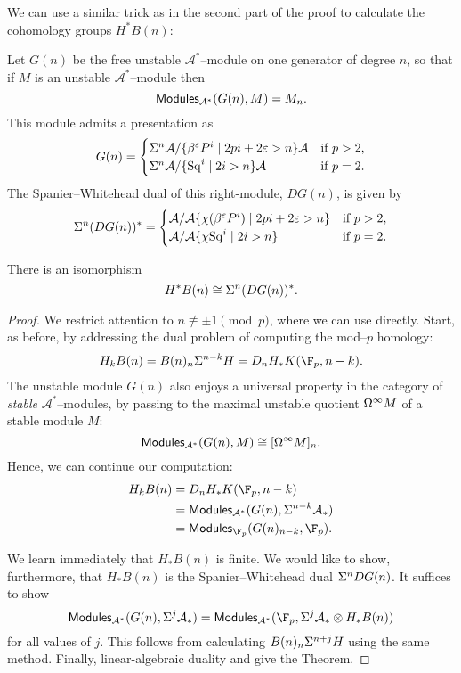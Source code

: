 We can use a similar trick as in the second part of the proof to calculate the cohomology groups $H^* B(n)$:

\begin{definition}\label{SpanierWhiteheadDualOfGeneratingModule}
Let $G(n)$ be the free unstable $\mathcal A^*$--module on one generator of degree $n$, so that if $M$ is an unstable $\mathcal A^*$--module then \[\mathsf{Modules}_{\mathcal A^*}(G(n), M) = M_n.\]  This module admits a presentation as \[G(n) = \begin{cases} \Sigma^n \mathcal A / \{\beta^\varepsilon P^i \mid 2pi + 2\varepsilon > n\}\mathcal A & \text{if $p > 2$}, \\ \Sigma^n \mathcal A / \{\operatorname{Sq}^i \mid 2i > n\}\mathcal A & \text{if $p = 2$}. \end{cases}\]  The Spanier--Whitehead dual of this right-module, $DG(n)$, is given by \[\Sigma^n (D G(n))^* = \begin{cases}\mathcal A / \mathcal A \{\chi(\beta^\varepsilon P^i) \mid 2pi + 2\varepsilon > n\} & \text{if $p > 2$}, \\ \mathcal A / \mathcal A \{\chi{\operatorname{Sq}^i} \mid 2i > n\} & \text{if $p = 2$}. \end{cases}\]
\end{definition}

\begin{theorem}
There is an isomorphism \[H^* B(n) \cong \Sigma^n(DG(n))^*.\]
\end{theorem}
\begin{proof}
We restrict attention to $n \not\equiv \pm 1 \pmod p$, where we can use  directly.  Start, as before, by addressing the dual problem of computing the mod--$p$ homology:
\begin{align*}
H_k B(n) = B(n)_n \Susp^{n-k} H = D_n H_* K(\F_p, n-k).
\end{align*}
The unstable module $G(n)$ also enjoys a universal property in the category of \emph{stable} $\mathcal A^*$--modules, by passing to the maximal unstable quotient $\Omega^\infty M$ of a stable module $M$: \[\mathsf{Modules}_{\mathcal A^*}(G(n), M) \cong [\Omega^\infty M]_n.\]  Hence, we can continue our computation:
\begin{align*}
H_k B(n) & = D_n H_* K(\F_p, n-k) \\
& = \CatOf{Modules}_{\mathcal A^*}(G(n), \Susp^{n-k} \mathcal A_*) \\
& = \CatOf{Modules}_{\F_p}(G(n)_{n-k}, \F_p).
\end{align*}

We learn immediately that $H_* B(n)$ is finite.  We would like to show, furthermore, that $H_* B(n)$ is the Spanier--Whitehead dual $\Sigma^n DG(n)$.  It suffices to show \[\CatOf{Modules}_{\mathcal A^*}(G(n), \Susp^j \mathcal A_*) = \CatOf{Modules}_{\mathcal A^*}(\F_p, \Susp^j \mathcal A_* \otimes H_* B(n))\] for all values of $j$.  This follows from calculating $B(n)_n \Sigma^{n+j} H$ using the same method.  Finally, linear-algebraic duality and  give the Theorem.
\end{proof}

